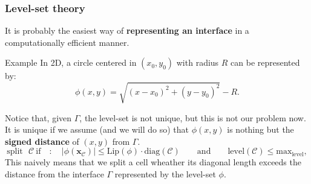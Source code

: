 \documentclass[8pt]{beamer}
\begin{document}
\begin{frame}
  \frametitle{Level-set theory}
It is probably the easiest way of \textbf{representing an interface} in a computationally efficient manner.
\pause
\begin{block}{Example}
 In 2D, a circle centered in $(x_0, y_0)$ with radius $R$ can be represented by:
 \begin{equation*}
  \phi(x,y) = \sqrt{(x-x_0)^2 + (y-y_0)^2} - R.
 \end{equation*}
 \pause
\end{block}
Notice that, given $\Gamma$, the level-set is not unique, but this is not our problem now. It is unique if we assume (and we will do so) that $\phi(x,y)$ is nothing but the \textbf{signed distance} of $(x,y)$ from $\Gamma$.
\begin{equation*}
 \text{split ~}\mathcal{C} ~ \text{if} \quad : \quad  \left | \phi(\mathbf{x}_{\mathcal{C}}) \right | \leq \text{Lip}(\phi) \cdot \text{diag}(\mathcal{C}) \qquad \text{and} \qquad \text{level}(\mathcal{C}) \leq \textrm{max}_{\textrm{level}},
\end{equation*}
This naively means that we split a cell wheather its diagonal length exceeds the distance from the interface $\Gamma$ represented by the level-set $\phi$.
\end{frame}
\end{document}

